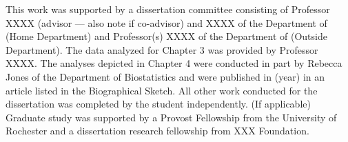 

This work was supported by a dissertation committee consisting of Professor
XXXX (advisor --- also note if co-advisor) and XXXX of the Department of (Home
Department) and Professor(s) XXXX of the Department of (Outside
Department). The data analyzed for Chapter 3 was provided by Professor
XXXX. The analyses depicted in Chapter 4 were conducted in part by Rebecca
Jones of the Department of Biostatistics and were published in (year) in an
article listed in the Biographical Sketch. All other work conducted for the
dissertation was completed by the student independently. (If applicable)
Graduate study was supported by a Provost Fellowship from the University of
Rochester and a dissertation research fellowship from XXX Foundation.


